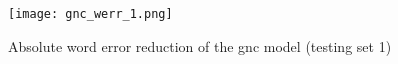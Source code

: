 \begin{figure}[!htbp]
	  \centering
	  \texttt{[image: gnc\_werr\_1.png]}
	      \caption{Absolute word error reduction of the gnc model (testing set 1)}
	      \label{figure:gnc1}
\end{figure}

%
%
%

\FloatBarrier
